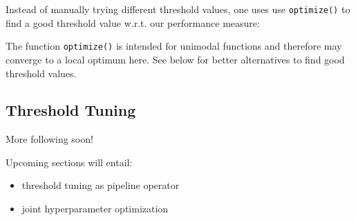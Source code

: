 \documentclass[
  11pt,
  parskip=half,
  DIV=calc,
  BCOR=10mm,
  x11names]{scrbook}
\makeatletter
\newenvironment{Shaded}{}{}
\newcommand{\CommentTok}[1]{\textcolor[rgb]{0.00,0.50,0.00}{#1}}
\newcommand{\ControlFlowTok}[1]{\textcolor[rgb]{0.00,0.00,1.00}{#1}}
\newcommand{\DecValTok}[1]{#1}
\newcommand{\FloatTok}[1]{#1}
\newcommand{\KeywordTok}[1]{\textcolor[rgb]{0.00,0.00,1.00}{#1}}
\newcommand{\NormalTok}[1]{#1}
\newcommand{\OperatorTok}[1]{#1}
\newcommand{\StringTok}[1]{\textcolor[rgb]{0.00,0.50,0.50}{#1}}
\providecommand{\tightlist}{%
  \setlength{\itemsep}{0pt}\setlength{\parskip}{0pt}}
\newenvironment{kframe}{%
\medskip{}
\setlength{\fboxsep}{.8em}
 \def\at@end@of@kframe{}%
 \ifinner\ifhmode%
  \def\at@end@of@kframe{\end{minipage}}%
  \begin{minipage}{\columnwidth}%
 \fi\fi%
 \def\FrameCommand##1{\hskip\@totalleftmargin \hskip-\fboxsep
 \colorbox{shadecolor}{##1}\hskip-\fboxsep
     \hskip-\linewidth \hskip-\@totalleftmargin \hskip\columnwidth}%
 \MakeFramed {\advance\hsize-\width
   \@totalleftmargin\z@ \linewidth\hsize
   \@setminipage}}%
 {\par\unskip\endMakeFramed%
 \at@end@of@kframe}
\newenvironment{rmdblock}[1]
  {
  \begin{itemize}
  \renewcommand{\labelitemi}{
    \raisebox{-.7\height}[0pt][0pt]{
      {\setkeys{Gin}{width=3em,keepaspectratio}\texttt{[image: images/\#1]}}
    }
  }
  \setlength{\fboxsep}{1em}
  \begin{kframe}
  \item
  }
  {
  \end{kframe}
  \end{itemize}
  }
\newenvironment{warning}
  {\begin{rmdblock}{warning}}
  {\end{rmdblock}}
\makeatother
\begin{document}
Instead of manually trying different threshold values, one uses use \texttt{optimize()} to find a good threshold value w.r.t. our performance measure:

\begin{Shaded}
\end{Shaded}

\begin{warning}
The function \texttt{optimize()} is intended for unimodal functions and
therefore may converge to a local optimum here. See below for better
alternatives to find good threshold values.
\end{warning}

\hypertarget{threshold-tuning-1}{%
\subsection{Threshold Tuning}\label{threshold-tuning-1}}

More following soon!

Upcoming sections will entail:

\begin{itemize}
\tightlist
\item
  threshold tuning as pipeline operator
\item
  joint hyperparameter optimization
\end{itemize}
\end{document}
